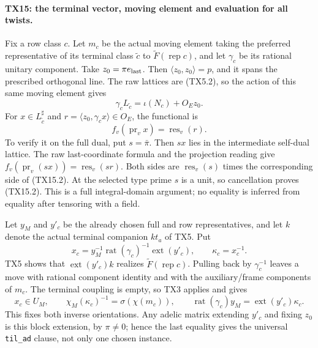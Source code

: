 \paragraph{TX15: the terminal vector, moving element and evaluation for all twists.}
Fix a row class \(c\). Let \(m_c\) be the actual moving
element taking the preferred representative of its terminal
class \(\widetilde c\) to \(\widetilde F(\operatorname{rep}c)\),
and let \(\gamma_c\) be its rational unitary component.
Take \(z_0=\pi e_{\rm last}\). Then
\(\langle z_0,z_0\rangle=p\), and it spans the prescribed
orthogonal line. The raw lattices are (TX5.2), so the action
of this same moving element gives
\[
 \gamma_c L_{\widetilde c}
      =\iota(N_c)+O_Ez_0.
 \tag{TX15.1}
\]
For \(x\in L_{\widetilde c}^\sharp\) and
\(r=\langle z_0,\gamma_cx\rangle\in O_E\), the functional is
\[
 f_v(\operatorname{pr}_v x)=\operatorname{res}_v(r).
 \tag{TX15.2}
\]
To verify it on the full dual, put \(s=\bar\pi\).
Then \(sx\) lies in the intermediate self-dual lattice.
The raw last-coordinate formula and the projection reading
give \(f_v(\operatorname{pr}_v(sx))=\operatorname{res}_v(sr)\).
Both sides are \(\operatorname{res}_v(s)\) times the
corresponding side of (TX15.2). At the selected type prime
\(s\) is a unit, so cancellation proves (TX15.2).
This is a full integral-domain argument; no equality is
inferred from equality after tensoring with a field.

Let \(y_M\) and \(y'_c\) be the already chosen full and row
representatives, and let \(k\) denote the actual terminal
companion \(kt_a\) of TX5. Put
\[
 x_c=y_M^{-1}\operatorname{rat}(\gamma_c)^{-1}
                 \operatorname{ext}(y'_c),\qquad
 \kappa_c=x_c^{-1}.
 \tag{TX15.3}
\]
TX5 shows that \(\operatorname{ext}(y'_c)k\) realizes
\(\widetilde F(\operatorname{rep}c)\). Pulling back by
\(\gamma_c^{-1}\) leaves a move with rational component
identity and with the auxiliary/frame components of \(m_c\).
The terminal coupling is empty, so TX3 applies and gives
\[
 x_c\in U_M,\qquad
 \chi_M(\kappa_c)^{-1}=\sigma(\chi(m_c)),\qquad
 \operatorname{rat}(\gamma_c)y_M
         =\operatorname{ext}(y'_c)\kappa_c.
 \tag{TX15.4}
\]
This fixes both inverse orientations. Any adelic matrix
extending \(y'_c\) and fixing \(z_0\) is this block extension,
by \(\pi\ne0\); hence the last equality gives the universal
\texttt{til\_ad} clause, not only one chosen instance.

